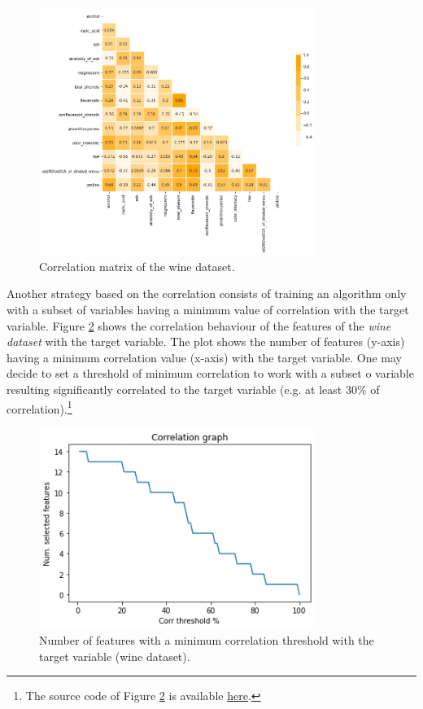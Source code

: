 \begin{figure}[hbt!]
\centering
\includegraphics[width=0.8\textwidth]{SectionLetsMath/dimensionalityReduction_figures/fig_corrMatrix.png}
\captionsetup{type=table}
\caption{Correlation matrix of the wine dataset.}
\label{fig_corrMatrix}
\end{figure}

Another strategy based on the correlation consists of training an algorithm only with a subset of variables having a minimum value of correlation with the target variable. Figure \ref{fig_selectCorr} shows the correlation behaviour of the features of the \textit{wine dataset} with the target variable. The plot shows the number of features (y-axis) having a minimum correlation value (x-axis) with the target variable. One may decide to set a threshold of minimum correlation to work with a subset o variable resulting significantly correlated to the target variable (e.g. at least 30\% of correlation).\footnote{The source code of Figure \ref{fig_selectCorr} is available \href{https://github.com/aletuf93/logproj/blob/master/examples/05.\%20Dimensionality\%20Reduction.ipynb}{here}.}

\begin{figure}[hbt!]
\centering
\includegraphics[width=0.8\textwidth]{SectionLetsMath/dimensionalityReduction_figures/fig_selectCorr.png}
\captionsetup{type=table}
\caption{Number of features with a minimum correlation threshold with the target variable (wine dataset).}
\label{fig_selectCorr}
\end{figure}

